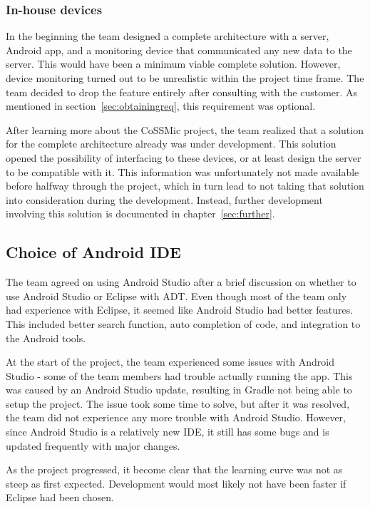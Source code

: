 \subsubsection{In-house devices}
In the beginning the team designed a complete architecture with a server, Android app, and a monitoring device that communicated any new data to the server. This would have been a minimum viable complete solution. However, device monitoring turned out to be unrealistic within the project time frame. The team decided to drop the feature entirely after consulting with the customer. As mentioned in section~\ref{sec:obtainingreq}, this requirement was optional.

After learning more about the CoSSMic project, the team realized that a solution for the complete architecture already was under development. This solution opened the possibility of interfacing to these devices, or at least design the server to be compatible with it. This information was unfortunately not made available before halfway through the project, which in turn lead to not taking that solution into consideration during the development. Instead, further development involving this solution is documented in chapter~\ref{sec:further}.

\subsection{Choice of Android IDE}
The team agreed on using Android Studio after a brief discussion on whether to use Android Studio or Eclipse with ADT. Even though most of the team only had experience with Eclipse, it seemed like Android Studio had better features. This included better search function, auto completion of code, and integration to the Android tools.
 
At the start of the project, the team experienced some issues with Android Studio - some of the team members had trouble actually running the app. This was caused by an Android Studio update, resulting in Gradle not being able to setup the project. The issue took some time to solve, but after it was resolved, the team did not experience any more trouble with Android Studio. However, since Android Studio is a relatively new IDE, it still has some bugs and is updated frequently with major changes.

As the project progressed, it become clear that the learning curve was not as steep as first expected. Development would most likely not have been faster if Eclipse had been chosen.

